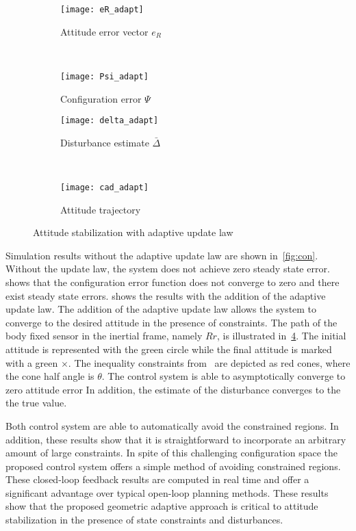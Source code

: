 \documentclass[letterpaper, 10 pt, conference]{ieeeconf}  %
\begin{document}
\begin{figure} 
	\centering 
	\begin{subfigure}[htbp]{0.5\columnwidth} 
		\texttt{[image: eR\_adapt]} 
		\caption{Attitude error vector \(e_R\) } \label{fig:eR_adapt} 
	\end{subfigure}~ %
	\begin{subfigure}[htbp]{0.5\columnwidth} 
		\texttt{[image: Psi\_adapt]} 
		\caption{Configuration error \( \Psi \)} \label{fig:Psi_adapt} 
	\end{subfigure}
	
	\centering
	\begin{subfigure}[htbp]{0.5\columnwidth} 
		\texttt{[image: delta\_adapt]} 
		\caption{Disturbance estimate \( \bar \Delta \)} \label{fig:delta_adapt} 
	\end{subfigure}~
	\begin{subfigure}[htbp]{0.5\columnwidth} 
		\texttt{[image: cad\_adapt]} 
		\caption{Attitude trajectory} \label{fig:cad_adapt} 
	\end{subfigure}
	\caption{Attitude stabilization with adaptive update law}
	\label{fig:adapt} 
\end{figure}

Simulation results without the adaptive update law are shown in~\cref{fig:con}.
Without the update law, the system does not achieve zero steady state error. 
 shows that the configuration error function does not converge to zero and there exist steady state errors.
 shows the results with the addition of the adaptive update law.
The addition of the adaptive update law allows the system to converge to the desired attitude in the presence of constraints.
The path of the body fixed sensor in the inertial frame, namely \( R r \), is illustrated in~\cref{fig:cad_adapt}.
The initial attitude is represented with the green circle while the final attitude is marked with a green \(\times\).
The inequality constraints from~ are depicted as red cones, where the cone half angle is \( \theta \).
The control system is able to asymptotically converge to zero attitude error 
In addition, the estimate of the disturbance converges to the the true value.

Both control system are able to automatically avoid the constrained regions. 
In addition, these results show that it is straightforward to incorporate an arbitrary amount of large constraints.
In spite of this challenging configuration space the proposed control system offers a simple method of avoiding constrained regions.
These closed-loop feedback results are computed in real time and offer a significant advantage over typical open-loop planning methods.
These results show that the proposed geometric adaptive approach is critical to attitude stabilization in the presence of state constraints and disturbances.
\end{document}
